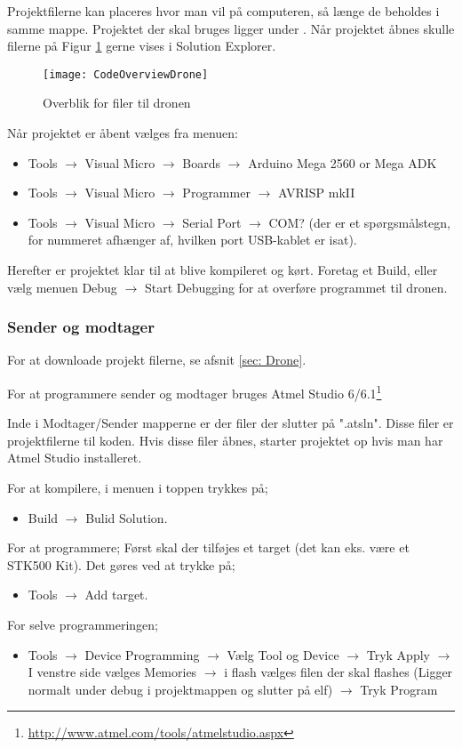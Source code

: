 \documentclass[Main]{subfiles}
\begin{document}
Projektfilerne kan placeres hvor man vil på computeren, så længe de beholdes i samme mappe.
Projektet der skal bruges ligger under .
Når projektet åbnes skulle filerne på Figur \ref{Fig:CodeOverviewDrone} gerne vises i Solution Explorer.

\begin{figure}[H]
\centering
\texttt{[image: CodeOverviewDrone]}
\caption{Overblik for filer til dronen}
\label{Fig:CodeOverviewDrone}
\end{figure}


Når projektet er åbent vælges fra menuen:
\begin{itemize}
\item Tools $\rightarrow$ Visual Micro $\rightarrow$ Boards $\rightarrow$ Arduino Mega 2560 or Mega ADK
\item Tools $\rightarrow$ Visual Micro $\rightarrow$ Programmer $\rightarrow$ AVRISP mkII
\item Tools $\rightarrow$ Visual Micro $\rightarrow$ Serial Port $\rightarrow$ COM? (der er et spørgsmålstegn, for nummeret afhænger af, hvilken port USB-kablet er isat).
\end{itemize}

Herefter er projektet klar til at blive kompileret og kørt.
Foretag et Build, eller vælg menuen Debug $\rightarrow$ Start Debugging for at overføre programmet til dronen.


\subsubsection{Sender og modtager}
For at downloade projekt filerne, se afsnit \ref{sec: Drone}.

For at programmere sender og modtager bruges Atmel Studio 6/6.1\footnote{\url{http://www.atmel.com/tools/atmelstudio.aspx}} 

Inde i Modtager/Sender mapperne er der filer der slutter på ".atsln". Disse filer er projektfilerne til koden. Hvis disse filer åbnes, starter projektet op hvis man har Atmel Studio installeret.

For at kompilere, i menuen i toppen trykkes på;
\begin{itemize}
\item Build $\rightarrow$ Bulid Solution.
\end{itemize}

For at programmere;
Først skal der tilføjes et target (det kan eks. være et STK500 Kit). Det gøres ved at trykke på;
\begin{itemize}
\item Tools $\rightarrow$ Add target.
\end{itemize}
For selve programmeringen;
\begin{itemize}
\item Tools $\rightarrow$ Device Programming $\rightarrow$ Vælg Tool og Device $\rightarrow$ Tryk Apply $\rightarrow$ I venstre side vælges Memories $\rightarrow$ i flash vælges filen der skal flashes (Ligger normalt under debug i projektmappen og slutter på elf) $\rightarrow$ Tryk Program
\end{itemize}
\end{document}
